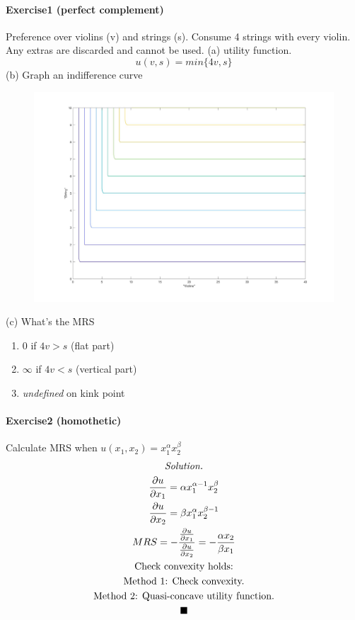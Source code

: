 \documentclass{article}
\newcommand{\tx}[1]{\text{{#1}}}
\newcommand{\pd}[2]{\frac{\partial {#1}}{\partial {#2}}}
\begin{document}
\paragraph{Exercise1 (perfect complement)} Preference over violins (v) and strings (s). Consume 4 strings with every violin. Any extras are discarded and cannot be used.
\newline
(a) utility function.
\[
	u(v, s) = min\{4v, s\}
\]
\newline
(b) Graph an indifference curve
\begin{figure}[!htb]
	\centering
	\includegraphics[width=0.8\linewidth]{eco206pic/perf_comp.jpg}
\end{figure}
\newline
(c) What's the MRS
\begin{enumerate}
	\item 0 if $4v>s$ (flat part)
	\item $\infty$ if $4v < s$ (vertical part)
	\item \emph{undefined} on kink point
\end{enumerate}

\paragraph{Exercise2 (homothetic)} Calculate MRS when $u(x_1, x_2) = x_1 ^ \alpha x_2 ^ \beta$
\begin{multline*}
	\emph{Solution.} \\
	\pd{u}{x_1} = \alpha x_1 ^ {\alpha - 1} x_2 ^ \beta \\
	\pd{u}{x_2} = \beta x_1 ^ \alpha x_2 ^ {\beta - 1} \\
	MRS = -\frac{\pd{u}{x_1}}{\pd{u}{x_2}} = - \frac{\alpha x_2}{\beta x_1} \\
	\tx{Check convexity holds:} \\
	\tx{Method 1: Check convexity.} \\
	\tx{Method 2: Quasi-concave utility function.} \\
	\blacksquare
\end{multline*}
\end{document}
